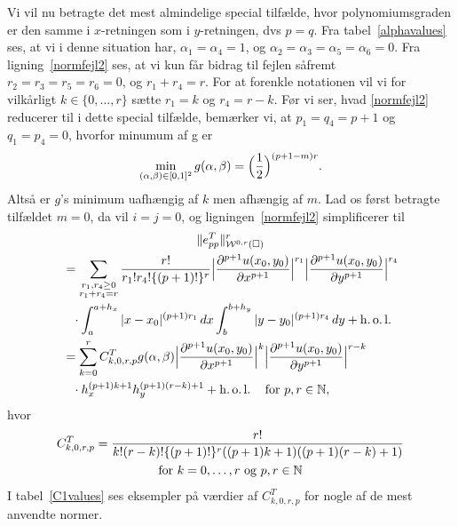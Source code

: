 Vi vil nu betragte det mest almindelige special tilfælde, hvor
polynomiumsgraden er den samme i $x$-retningen som i $y$-retningen,
dvs $p=q$. Fra tabel~\ref{alphavalues} ses, at vi i denne situation har, $\alpha_1
=\alpha_4 =1$, og $\alpha_2 =\alpha_3 =\alpha_5 =\alpha_6 =0$. Fra
ligning~\eqref{normfejl2} ses, at vi kun får bidrag til fejlen såfremt $r_2
=r_3 =r_5 =r_6=0$, og $r_1 +r_4 =r$. For at forenkle notationen vil
vi for vilkårligt $k\in\{0,\ldots,r\}$ sætte $r_1=k$ og $r_4=r-k$. Før
vi ser, hvad \eqref{normfejl2} reducerer til i dette special tilfælde, bemærker
vi, at $p_1=q_4=p+1$ og $q_1=p_4=0$, hvorfor minumum af g er
\begin{equation}
  \min_{(\alpha ,\beta)\in [0,1]^2} g(\alpha ,\beta) =
  \Bigl( \frac{1}{2} \Bigr)^{(p+1-m)r}.
\end{equation}
Altså er $g$'s minimum uafhængig af $k$ men afhængig af $m$. Lad os
først betragte tilfældet $m=0$, da vil $i=j=0$, og ligningen~\eqref{normfejl2}
simplificerer til
\begin{multline} \label{mnul}
  \|e_{pp}^T\|_{{\mathcal W}^{0,r}(\Box)}^r \\
\begin{split}
  &= \sum_{\substack{ r_1,r_4\geq 0 \\ r_1+r_4=r }}
  \frac{r!}{r_1!r_4!\{(p+1)!\}^r}
  \Bigl| \frac{\partial^{p+1} u(x_0,y_0)}{\partial x^{p+1}} \Bigr|^{r_1}
  \Bigl| \frac{\partial^{p+1} u(x_0,y_0)}{\partial y^{p+1}} \Bigr|^{r_4} \\
  &\phantom{=}\cdot \int_a^{a+h_x} |x-x_0|^{(p+1)r_1}\, dx
  \int_b^{b+h_y} |y-y_0|^{(p+1)r_4}\, dy + \operatorname{h.o.l.} \\
  &= \sum_{k=0}^r C_{k,0,r,p}^T g(\alpha,\beta)
  \Bigl| \frac{\partial^{p+1} u(x_0,y_0)}{\partial x^{p+1}} \Bigr|^k
  \Bigl| \frac{\partial^{p+1} u(x_0,y_0)}{\partial y^{p+1}} \Bigr|^{r-k} \\
  &\phantom{=}\cdot h_x^{(p+1)k+1} h_y^{(p+1)(r-k)+1} +
  \operatorname{h.o.l.} \quad \text{for $p,r\in\mathbb{N}$}, \\
\end{split}
\end{multline}
hvor
\begin{multline} \label{mnulc}
  C_{k,0,r,p}^T = \frac{r!}
  {k!(r-k)!\{(p+1)!\}^r((p+1)k+1)((p+1)(r-k)+1)} \\
  \text{for $k=0,\ldots ,r$ og $p,r\in\mathbb{N}$}
\end{multline}
I tabel~\ref{C1values} ses eksempler på værdier af $C^T_{k,0,r,p}$ for
nogle af de mest anvendte normer.
